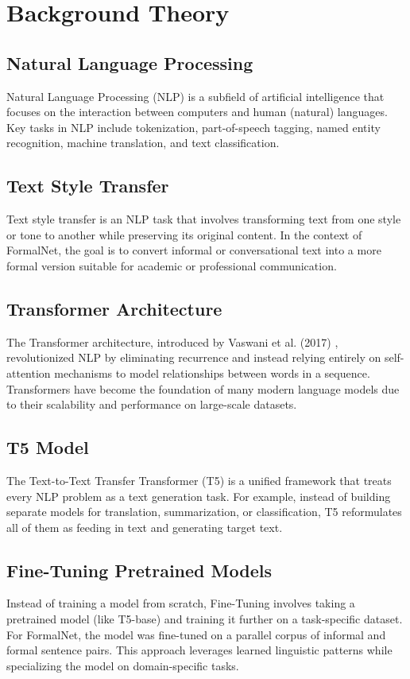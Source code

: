 \section{Background Theory}

\subsection{Natural Language Processing}
Natural Language Processing (NLP) is a subfield of artificial intelligence that focuses on the interaction between computers and human (natural) languages. Key tasks in NLP include tokenization, part-of-speech tagging, named entity recognition, machine translation, and text classification.

\subsection{Text Style Transfer}
Text style transfer is an NLP task that involves transforming text from one style or tone to another while preserving its original content. In the context of FormalNet, the goal is to convert informal or conversational text into a more formal version suitable for academic or professional communication. 

\subsection{Transformer Architecture}
The Transformer architecture, introduced by Vaswani et al. (2017) \cite{vaswani2017attention}, revolutionized NLP by eliminating recurrence and instead relying entirely on self-attention mechanisms to model relationships between words in a sequence. Transformers have become the foundation of many modern language models due to their scalability and performance on large-scale datasets.

\subsection{T5 Model}
The Text-to-Text Transfer Transformer (T5)\cite{t5-raffel2020exploring} is a unified framework that treats every NLP problem as a text generation task. For example, instead of building separate models for translation, summarization, or classification, T5 reformulates all of them as feeding in text and generating target text. 

\subsection{Fine-Tuning Pretrained Models}
Instead of training a model from scratch, Fine-Tuning involves taking a pretrained model (like T5-base) and training it further on a task-specific dataset. For FormalNet, the model was fine-tuned on a parallel corpus of informal and formal sentence pairs. This approach leverages learned linguistic patterns while specializing the model on domain-specific tasks.

